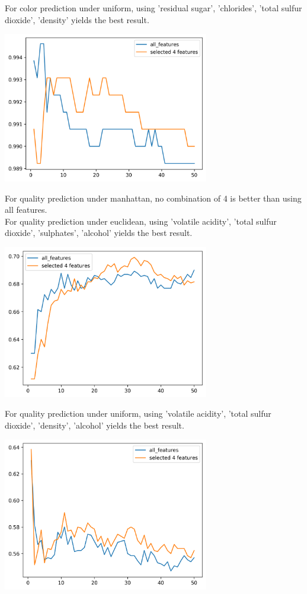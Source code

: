 \documentclass[12pt]{article}
\begin{document}
\noindent
For color prediction under uniform, using 'residual sugar', 'chlorides', 'total sulfur dioxide', 'density' yields the best result.
\begin{center}
    \includegraphics[width=9cm]{./select4features/color_u.png}
\end{center}
\noindent
For quality prediction under manhattan, no combination of 4 is better than using all features.\\
For quality prediction under euclidean, using 'volatile acidity', 'total sulfur dioxide', 'sulphates', 'alcohol' yields the best result.
\begin{center}
    \includegraphics[width=9cm]{./select4features/quality_e.png}
\end{center}
\noindent
For quality prediction under uniform, using 'volatile acidity', 'total sulfur dioxide', 'density', 'alcohol' yields the best result.
\begin{center}
    \includegraphics[width=9cm]{./select4features/quality_u.png}
\end{center}
\end{document}
